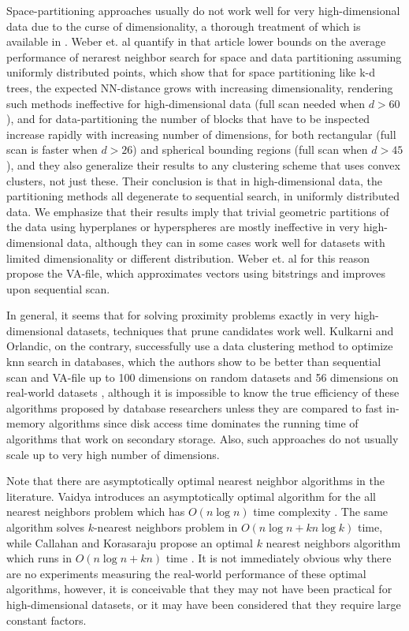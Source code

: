 \documentclass{comjnl}
\begin{document}
Space-partitioning approaches usually do not work well for very
high-dimensional data due to the curse of dimensionality, a thorough
treatment of which is available in \cite{weber1998}. Weber et. al
quantify in that article lower bounds on the average performance of
nerarest neighbor search for space and data partitioning assuming
uniformly distributed points, which show that for space partitioning
like k-d trees, the expected NN-distance grows with increasing
dimensionality, rendering such methods ineffective for
high-dimensional data (full scan needed when $d>60$), and for
data-partitioning the number of blocks that have to be inspected
increase rapidly with increasing number of dimensions, for both
rectangular (full scan is faster when $d>26$) and spherical bounding
regions (full scan when $d>45$), and they also generalize their
results to any clustering scheme that uses convex clusters, not just
these. Their conclusion is that in high-dimensional data, the
partitioning methods all degenerate to sequential search, in uniformly
distributed data.  We emphasize that their results imply that trivial
geometric partitions of the data using hyperplanes or hyperspheres are
mostly ineffective in very high-dimensional data, although they can in
some cases work well for datasets with limited dimensionality or
different distribution.  Weber et. al for this reason propose the
VA-file, which approximates vectors using bitstrings \cite{weber1998}
and improves upon sequential scan. 

In general, it seems that for
solving proximity problems exactly in very high-dimensional datasets,
techniques that prune candidates work well. Kulkarni and Orlandic, on
the contrary, successfully use a data clustering method to optimize
knn search in databases, which the authors show to be better than
sequential scan and VA-file up to 100 dimensions on random datasets
and 56 dimensions on real-world datasets \cite{kulkarni06}, although
it is impossible to know the true efficiency of these algorithms
proposed by database researchers unless they are compared to fast
in-memory algorithms since disk access time dominates the running time
of algorithms that work on secondary storage. Also, such approaches do
not usually scale up to very high number of dimensions.

Note that there are asymptotically optimal nearest neighbor algorithms
in the literature. Vaidya introduces an asymptotically optimal
algorithm for the all nearest neighbors problem which has $O(n \log
n)$ time complexity \cite{vaidya1989}. The same algorithm solves
$k$-nearest neighbors problem in $O(n \log n + k n \log k)$ time,
while Callahan and Korasaraju propose an optimal $k$ nearest neighbors
algorithm which runs in $O(n \log n + kn)$ time
\cite{Callahan92adecomposition}. It is not immediately obvious why
there are no experiments measuring the real-world performance of these
optimal algorithms, however, it is conceivable that they may not have
been practical for high-dimensional datasets, or it may have been 
considered that they require large constant factors.
\end{document}
